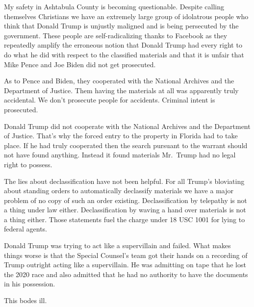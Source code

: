 My safety in Ashtabula County is becoming questionable. Despite calling
themselves Christians we have an extremely large group of idolatrous
people who think that Donald Trump is unjustly maligned and is being
persecuted by the government. These people are self-radicalizing thanks
to Facebook as they repeatedly amplify the erroneous notion that Donald
Trump had every right to do what he did with respect to the classified
materials and that it is unfair that Mike Pence and Joe Biden did not
get prosecuted.

As to Pence and Biden, they cooperated with the National Archives and
the Department of Justice. Them having the materials at all was
apparently truly accidental. We don't prosecute people for accidents.
Criminal intent is prosecuted.

Donald Trump did not cooperate with the National Archives and the
Department of Justice. That's why the forced entry to the property in
Florida had to take place. If he had truly cooperated then the search
pursuant to the warrant should not have found anything. Instead it found
materials Mr.~Trump had no legal right to possess.

The lies about declassification have not been helpful. For all Trump's
bloviating about standing orders to automatically declassify materials
we have a major problem of no copy of such an order existing.
Declassification by telepathy is not a thing under law either.
Declassification by waving a hand over materials is not a thing either.
Those statements fuel the charge under 18 USC 1001 for lying to federal
agents.

Donald Trump was trying to act like a supervillain and failed. What
makes things worse is that the Special Counsel's team got their hands on
a recording of Trump outright acting like a supervillain. He was
admitting on tape that he lost the 2020 race and also admitted that he
had no authority to have the documents in his possession.

This bodes ill.

